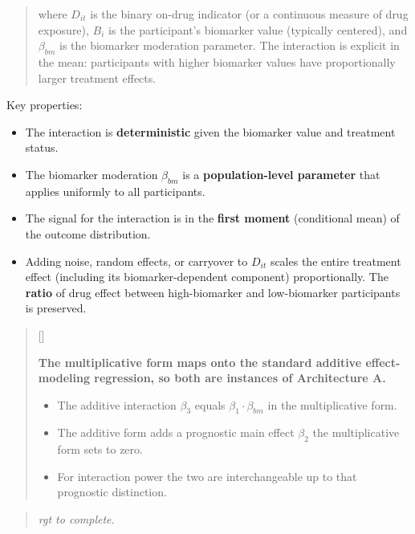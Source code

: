 \documentclass[
  11pt,
]{article}
\newcounter{pgraph}
\newenvironment{bullets}{%
  \stepcounter{pgraph}%
  \begin{quote}\small\sffamily\color[gray]{0.30}%
  {\normalfont\scriptsize\color[gray]{0.58}[\thepgraph]\enspace}}{%
  \end{quote}}
\newenvironment{rgt}{%
  \begin{quote}\small\itshape\color[RGB]{20,60,160}}{%
  \end{quote}}
\newenvironment{orig}{%
  \begin{quote}\normalsize\color[gray]{0.55}}{%
  \end{quote}}
\begin{document}
\begin{orig}
where \(D_{it}\) is the binary on-drug indicator (or a continuous
measure of drug exposure), \(B_i\) is the participant's biomarker value
(typically centered), and \(\beta_{bm}\) is the biomarker moderation
parameter. The interaction is explicit in the mean: participants with
higher biomarker values have proportionally larger treatment effects.

\end{orig}

Key properties:

\begin{itemize}
\item The interaction is \textbf{deterministic} given the biomarker value
  and treatment status.
\item The biomarker moderation $\beta_{bm}$ is a \textbf{population-level
  parameter} that applies uniformly to all participants.
\item The signal for the interaction is in the \textbf{first moment}
  (conditional mean) of the outcome distribution.
\item Adding noise, random effects, or carryover to $D_{it}$ scales
  the entire treatment effect (including its biomarker-dependent
  component) proportionally. The \textbf{ratio} of drug effect between
  high-biomarker and low-biomarker participants is preserved.
\end{itemize}

\begin{bullets}

\textbf{The multiplicative form maps onto the standard additive
effect-modeling regression, so both are instances of Architecture
A.}

\begin{itemize}\setlength{\itemsep}{2pt}\setlength{\parskip}{0pt}
\item The additive interaction $\beta_3$ equals
$\beta_1 \cdot \beta_{bm}$ in the multiplicative form.
\item The additive form adds a prognostic main effect $\beta_2$ the
multiplicative form sets to zero.
\item For interaction power the two are interchangeable up to that
prognostic distinction.
\end{itemize}

\end{bullets}

\begin{rgt}
rgt to complete.

\end{rgt}
\end{document}
